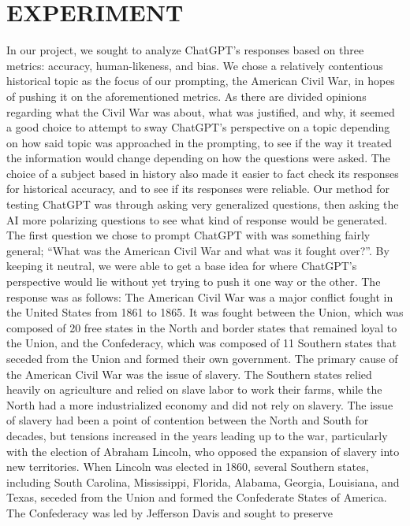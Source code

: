 \documentclass[letterpaper, 10 pt, conference]{ieeeconf}  %
\begin{document}
\section{EXPERIMENT}

In our project, we sought to analyze ChatGPT’s responses based on three metrics: accuracy, human-likeness, and bias. We chose a
relatively contentious historical topic as the focus of our prompting, the American Civil War, in hopes of pushing it on the
aforementioned metrics. As there are divided opinions regarding what the Civil War was about, what was justified, and why, it
seemed a good choice to attempt to sway ChatGPT’s perspective on a topic depending on how said topic was approached in the
prompting, to see if the way it treated the information would change depending on how the questions were asked. The choice of a
subject based in history also made it easier to fact check its responses for historical accuracy, and to see if its responses were
reliable.
Our method for testing ChatGPT was through asking very generalized questions, then asking the AI more polarizing questions to
see what kind of response would be generated. The first question we chose to prompt ChatGPT with was something fairly general;
“What was the American Civil War and what was it fought over?”. By keeping it neutral, we were able to get a base idea for where
ChatGPT’s perspective would lie without yet trying to push it one way or the other. The response was as follows:
The American Civil War was a major conflict fought in the United States from 1861 to 1865. It was
fought between the Union, which was composed of 20 free states in the North and border states
that remained loyal to the Union, and the Confederacy, which was composed of 11 Southern states
that seceded from the Union and formed their own government.
The primary cause of the American Civil War was the issue of slavery. The Southern states relied
heavily on agriculture and relied on slave labor to work their farms, while the North had a more
industrialized economy and did not rely on slavery. The issue of slavery had been a point of
contention between the North and South for decades, but tensions increased in the years leading up
to the war, particularly with the election of Abraham Lincoln, who opposed the expansion of slavery
into new territories.
When Lincoln was elected in 1860, several Southern states, including South Carolina, Mississippi,
Florida, Alabama, Georgia, Louisiana, and Texas, seceded from the Union and formed the
Confederate States of America. The Confederacy was led by Jefferson Davis and sought to preserve
\end{document}
